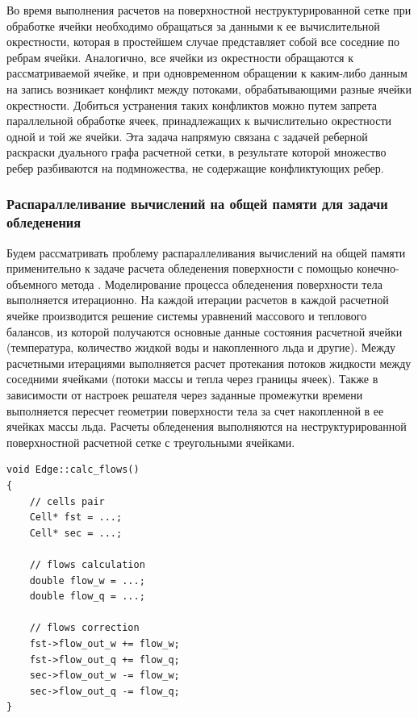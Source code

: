 Во время выполнения расчетов на поверхностной неструктурированной сетке при обработке ячейки необходимо обращаться за данными к ее вычислительной окрестности, которая в простейшем случае представляет собой все соседние по ребрам ячейки.
Аналогично, все ячейки из окрестности обращаются к рассматриваемой ячейке, и при одновременном обращении к каким-либо данным на запись возникает конфликт между потоками, обрабатывающими разные ячейки окрестности.
Добиться устранения таких конфликтов можно путем запрета параллельной обработке ячеек, принадлежащих к вычислительно окрестности одной и той же ячейки.
Эта задача напрямую связана с задачей реберной раскраски дуального графа расчетной сетки, в результате которой множество ребер разбиваются на подмножества, не содержащие конфликтующих ребер.

\subsubsection{Распараллеливание вычислений на общей памяти для задачи обледенения}\label{sec:text_3_edge_coloring}

Будем рассматривать проблему распараллеливания вычислений на общей памяти применительно к задаче расчета обледенения поверхности с помощью конечно-объемного метода \cite{Gulicheva2024}.
Моделирование процесса обледенения поверхности тела выполняется итерационно.
На каждой итерации расчетов в каждой расчетной ячейке производится решение системы уравнений массового и теплового балансов, из которой получаются основные данные состояния расчетной ячейки (температура, количество жидкой воды и накопленного льда и другие).
Между расчетными итерациями выполняется расчет протекания потоков жидкости между соседними ячейками (потоки массы и тепла через границы ячеек).
Также в зависимости от настроек решателя через заданные промежутки времени выполняется пересчет геометрии поверхности тела за счет накопленной в ее ячейках массы льда.
Расчеты обледенения выполняются на неструктурированной поверхностной расчетной сетке с треугольными ячейками.

\begin{lstlisting}[caption={Расчет протекания потоков через ребро сетки.}, label={lst:text_3_flows_through_edge}]
void Edge::calc_flows()
{
    // cells pair
    Cell* fst = ...;
    Cell* sec = ...;

    // flows calculation
    double flow_w = ...;
    double flow_q = ...;

    // flows correction
    fst->flow_out_w += flow_w;
    fst->flow_out_q += flow_q;
    sec->flow_out_w -= flow_w;
    sec->flow_out_q -= flow_q;
}
\end{lstlisting}

